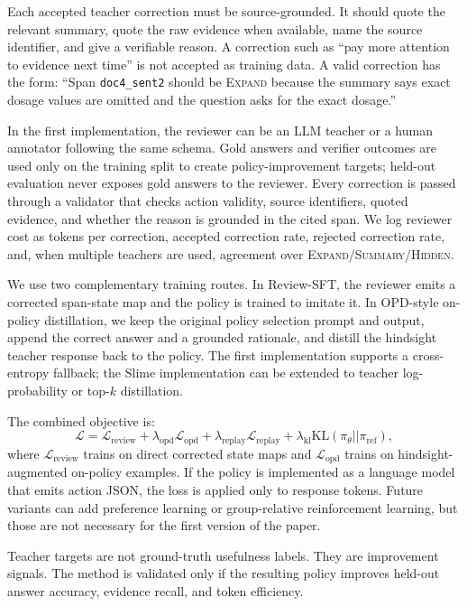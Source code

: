 \documentclass[11pt]{article}
\newcommand{\expandact}{\textsc{Expand}}
\newcommand{\summaryact}{\textsc{Summary}}
\newcommand{\hiddenact}{\textsc{Hidden}}
\begin{document}
Each accepted teacher correction must be source-grounded. It should quote the relevant summary, quote the raw evidence when available, name the source identifier, and give a verifiable reason. A correction such as ``pay more attention to evidence next time'' is not accepted as training data. A valid correction has the form: ``Span \texttt{doc4\_sent2} should be \expandact{} because the summary says exact dosage values are omitted and the question asks for the exact dosage.''

In the first implementation, the reviewer can be an LLM teacher or a human annotator following the same schema. Gold answers and verifier outcomes are used only on the training split to create policy-improvement targets; held-out evaluation never exposes gold answers to the reviewer. Every correction is passed through a validator that checks action validity, source identifiers, quoted evidence, and whether the reason is grounded in the cited span. We log reviewer cost as tokens per correction, accepted correction rate, rejected correction rate, and, when multiple teachers are used, agreement over \expandact{}/\summaryact{}/\hiddenact{}.

We use two complementary training routes. In Review-SFT, the reviewer emits a corrected span-state map and the policy is trained to imitate it. In OPD-style on-policy distillation, we keep the original policy selection prompt and output, append the correct answer and a grounded rationale, and distill the hindsight teacher response back to the policy. The first implementation supports a cross-entropy fallback; the Slime implementation can be extended to teacher log-probability or top-$k$ distillation.

The combined objective is:
\begin{equation}
\mathcal{L}
= \mathcal{L}_{\mathrm{review}}
+ \lambda_{\mathrm{opd}}\mathcal{L}_{\mathrm{opd}}
+ \lambda_{\mathrm{replay}}\mathcal{L}_{\mathrm{replay}}
+ \lambda_{\mathrm{kl}}\mathrm{KL}(\pi_\theta || \pi_{\mathrm{ref}}),
\end{equation}
where $\mathcal{L}_{\mathrm{review}}$ trains on direct corrected state maps and $\mathcal{L}_{\mathrm{opd}}$ trains on hindsight-augmented on-policy examples. If the policy is implemented as a language model that emits action JSON, the loss is applied only to response tokens. Future variants can add preference learning or group-relative reinforcement learning, but those are not necessary for the first version of the paper.

Teacher targets are not ground-truth usefulness labels. They are improvement signals. The method is validated only if the resulting policy improves held-out answer accuracy, evidence recall, and token efficiency.
\end{document}
